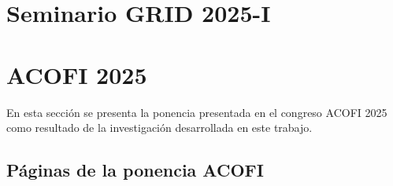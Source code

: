 \section{Seminario GRID 2025-I}

\section{ACOFI 2025}

En esta sección se presenta la ponencia presentada en el congreso ACOFI 2025 como resultado de la investigación desarrollada en este trabajo.

\subsection{Páginas de la ponencia ACOFI}

